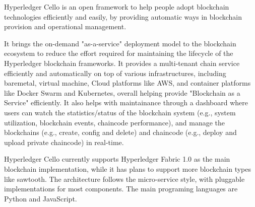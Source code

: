 Hyperledger Cello is an open framework to help people adopt blockchain technologies efficiently and easily, by providing automatic ways in blockchain provision and operational management. 

It brings the on-demand "as-a-service" deployment model to the blockchain ecosystem to reduce the effort required for maintaining the lifecycle of the Hyperledger blockchain frameworks. It provides a multi-tenant chain service efficiently and automatically on top of various infrastructures, including baremetal, virtual machine, Cloud platforms like AWS, and container platforms like Docker Swarm and Kubernetes, overall helping provide "Blockchain as a Service" efficiently. It also helps with maintainance through a dashboard where users can watch the statistics/status of the blockchain system (e.g., system utilization, blockchain events, chaincode performance), and manage the blockchains (e.g., create, config and delete) and chaincode (e.g., deploy and upload private chaincode) in real-time.

Hyperledger Cello currently supports Hyperledger Fabric 1.0 as the main blockchain implementation, while it has plans to support more blockchain types like sawtooth. The architecture follows the micro-service style, with pluggable implementations for most components. The main programing languages are Python and JavaScript.
